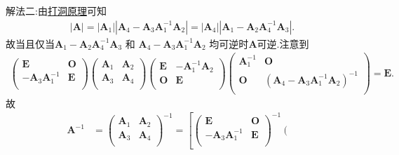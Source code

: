 \documentclass[../../main.tex]{subfiles}%
\begin{document}
\begin{solution}
{\color{blue}解法二:}由\hyperref[proposition:打洞原理]{打洞原理}可知
\begin{align*}
|\boldsymbol{A}|=\left| \boldsymbol{A}_1 \right|| \boldsymbol{A}_4-\boldsymbol{A}_3\boldsymbol{A}_{1}^{-1}\boldsymbol{A}_2 |=\left| \boldsymbol{A}_4 \right|| \boldsymbol{A}_1-\boldsymbol{A}_2\boldsymbol{A}_{4}^{-1}\boldsymbol{A}_3 |.
\end{align*}
故当且仅当\(\boldsymbol{A}_1 - \boldsymbol{A}_2\boldsymbol{A}_4^{-1}\boldsymbol{A}_3\) 和 \(\boldsymbol{A}_4 - \boldsymbol{A}_3\boldsymbol{A}_1^{-1}\boldsymbol{A}_2\) 均可逆时$\boldsymbol{A}$可逆.注意到
\begin{align*}
\left( \begin{matrix}
\boldsymbol{E}&		\boldsymbol{O}\\
-\boldsymbol{A}_3\boldsymbol{A}_{1}^{-1}&		\boldsymbol{E}\\
\end{matrix} \right) \left( \begin{matrix}
\boldsymbol{A}_1&		\boldsymbol{A}_2\\
\boldsymbol{A}_3&		\boldsymbol{A}_4\\
\end{matrix} \right) \left( \begin{matrix}
\boldsymbol{E}&		-\boldsymbol{A}_{1}^{-1}\boldsymbol{A}_2\\
\boldsymbol{O}&		\boldsymbol{E}\\
\end{matrix} \right) \left( \begin{matrix}
\boldsymbol{A}_{1}^{-1}&		\boldsymbol{O}\\
\boldsymbol{O}&		\left( \boldsymbol{A}_4-\boldsymbol{A}_3\boldsymbol{A}_{1}^{-1}\boldsymbol{A}_2 \right) ^{-1}\\
\end{matrix} \right) =\boldsymbol{E}.
\end{align*}
故
\begin{align*}
\boldsymbol{A}^{-1}&=\left( \begin{matrix}
\boldsymbol{A}_1&		\boldsymbol{A}_2\\
\boldsymbol{A}_3&		\boldsymbol{A}_4\\
\end{matrix} \right) ^{-1}=\left[ \left( \begin{matrix}
\boldsymbol{E}&		\boldsymbol{O}\\
-\boldsymbol{A}_3\boldsymbol{A}_{1}^{-1}&		\boldsymbol{E}\\
\end{matrix} \right) ^{-1}\left( \begin{matrix}

\end{matrix}
\end{align*}
\end{solution}
\end{document}
